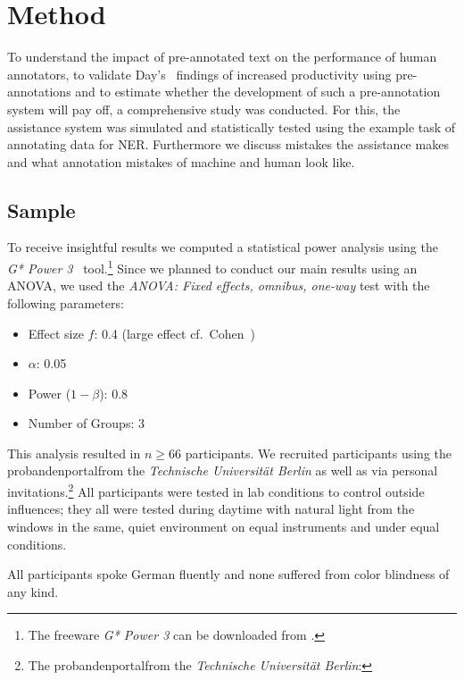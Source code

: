 \section{Method}
	\label{sec:method}
	To understand the impact of pre-annotated text on the performance of human annotators, to validate Day's~\cite{day1997mixed} findings of increased productivity using pre-annotations and to estimate whether the development of such a pre-annotation system will pay off, a comprehensive study was conducted. For this, the assistance system was simulated and statistically tested using the example task of annotating data for \ac{NER}. Furthermore we discuss mistakes the assistance makes and what annotation mistakes of machine and human look like.

	\subsection{Sample}
		To receive insightful results we computed a statistical power analysis using the \textit{G* Power 3}~\cite{faul2007g} tool.\footnote{The freeware \textit{G* Power 3} can be downloaded from .}
		Since we planned to conduct our main results using an \ac{ANOVA}, we used the \textit{\ac{ANOVA}: Fixed effects, omnibus, one-way} test with the following parameters:
		\begin{itemize}
			\item Effect size \(f\): 0.4 (large effect cf.~Cohen~\cite{cohen1977statistical})
			\item \(\alpha\): 0.05
			\item Power (\(1 - \beta\)): 0.8
			\item Number of Groups: 3
		\end{itemize}

		This analysis resulted in \(n \geq 66\) participants. We recruited participants using the \lqq probandenportal\rqq from the \textit{Technische Universität Berlin} as well as via personal invitations.\footnote{The \lqq probandenportal\rqq from the \textit{Technische Universität Berlin}: }
		All participants were tested in lab conditions to control outside influences; they all were tested during daytime with natural light from the windows in the same, quiet environment on equal instruments and under equal conditions.

		All participants spoke German fluently and none suffered from color blindness of any kind.

